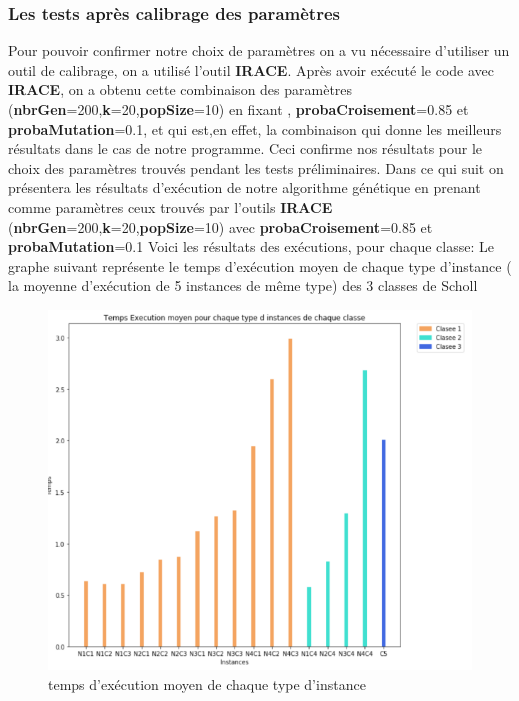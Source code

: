 \documentclass{article}
\begin{document}
\subsubsection{Les tests après calibrage des paramètres}
Pour pouvoir confirmer notre choix de paramètres on a vu nécessaire d’utiliser un outil de calibrage, on a utilisé l'outil \textbf{IRACE}. 
\newline
Après avoir exécuté le code avec \textbf{IRACE}, on a obtenu cette combinaison des paramètres (\textbf{nbrGen}=200,\textbf{k}=20,\textbf{popSize}=10) en fixant , \textbf{probaCroisement}=0.85 et \textbf{probaMutation}=0.1, et qui est,en effet, la combinaison qui donne les meilleurs résultats dans le cas de notre programme. Ceci confirme nos résultats pour le choix des paramètres trouvés pendant les tests préliminaires.
\newline
\newline
Dans ce qui suit on présentera les résultats d’exécution de notre algorithme génétique en prenant comme paramètres ceux trouvés par l’outils \textbf{IRACE} (\textbf{nbrGen}=200,\textbf{k}=20,\textbf{popSize}=10) avec \textbf{probaCroisement}=0.85 et \textbf{probaMutation}=0.1
\newline
Voici les résultats des exécutions, pour chaque classe:
\newline
Le graphe suivant représente le temps d'exécution moyen de chaque type d’instance ( la moyenne d'exécution de 5 instances de même type) des 3 classes de Scholl
\begin{figure}[H]
  \includegraphics[width=\linewidth]{../figures/pic07.PNG}
  \caption{temps d'exécution moyen de chaque type d’instance}
\end{figure}
\end{document}
